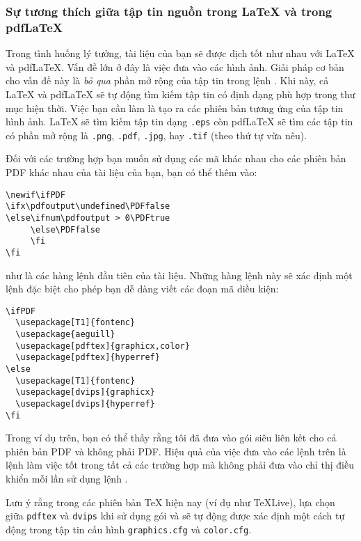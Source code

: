 \subsubsection{Sự tương thích giữa tập tin nguồn trong \LaTeX{} và trong pdf\LaTeX{}} \label{sec:pdfcompat}

Trong tình huống lý tưởng, tài liệu của bạn sẽ được dịch tốt như nhau với \LaTeX{} và pdf\LaTeX{}. Vấn đề lớn ở đây là việc đưa vào các hình ảnh. Giải pháp cơ bản cho vấn đề này là \emph{bỏ qua} phần mở rộng của tập tin trong lệnh . Khi này, cả \LaTeX{} và pdf\LaTeX{} sẽ tự động tìm kiếm tập tin có định dạng phù hợp trong thư mục hiện thời. Việc bạn cần làm là tạo ra các phiên bản tương ứng của tập tin hình ảnh. \LaTeX{} sẽ tìm kiếm tập tin dạng \texttt{.eps} còn pdf\LaTeX{} sẽ tìm các tập tin có phần mở rộng là \texttt{.png}, \texttt{.pdf}, \texttt{.jpg},
 hay \texttt{.tif} (theo thứ tự vừa nêu).

Đối với các trường hợp bạn muốn sử dụng các mã khác nhau cho các phiên bản PDF khác nhau của tài liệu của bạn, bạn có thể thêm vào:
\begin{code}
\begin{verbatim}
\newif\ifPDF
\ifx\pdfoutput\undefined\PDFfalse
\else\ifnum\pdfoutput > 0\PDFtrue
     \else\PDFfalse
     \fi
\fi
\end{verbatim}
\end{code}
như là các hàng lệnh đầu tiên của tài liệu. Những hàng lệnh này sẽ xác định một lệnh đặc biệt cho phép bạn dễ dàng viết các đoạn mã diều kiện:
\begin{code}
\begin{verbatim}
\ifPDF
  \usepackage[T1]{fontenc}
  \usepackage{aeguill}
  \usepackage[pdftex]{graphicx,color}
  \usepackage[pdftex]{hyperref}
\else
  \usepackage[T1]{fontenc}
  \usepackage[dvips]{graphicx}
  \usepackage[dvips]{hyperref}
\fi
\end{verbatim}
\end{code}
Trong ví dụ trên, bạn có thể thấy rằng tôi đã đưa vào gói siêu liên kết cho cả phiên bản PDF và không phải PDF. Hiệu quả của việc đưa vào các lệnh trên là lệnh  làm việc tốt trong tất cả các trường hợp mà không phải đưa vào chỉ thị điều khiển mỗi lần sử dụng lệnh .

Lưu ý rằng trong các phiên bản \TeX{} hiện nay (ví dụ như \TeX{}Live), lựa chọn giữa \texttt{pdftex} và \texttt{dvips} khi
sử dụng gói  và  sẽ tự động được xác định một cách tự động trong tập tin cấu hình \texttt{graphics.cfg} và \texttt{color.cfg}.

